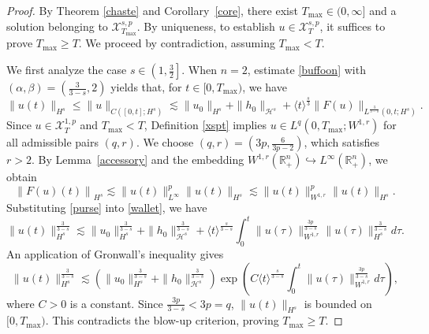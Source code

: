 \documentclass[preprint,compress,12pt]{elsarticle}
\numberwithin{equation}{section}
\begin{document}
\begin{proof}
	By Theorem \ref{chaste} and Corollary~\ref{core}, there exist $T_{\max}\in(0,\infty]$ and a solution belonging to $\mathscr{X}^{s,p}_{T_{\max}}$. By uniqueness, to establish $u \in \mathscr{X}^{s,p}_{T}$, it suffices to prove $T_{\max} \geq T$. We proceed by contradiction, assuming $T_{\max} < T$.
	
	
	We first analyze the case $s \in \left(1,\frac{3}{2}\right]$. When $n=2$, estimate \eqref{buffoon} with $\left(\alpha,\beta\right)=\left(\frac{3}{3-s},2\right)$ yields that, for $t\in [0,T_{\max})$, we have
	\begin{equation}\label{wallet}
		\|u(t)\|_{H^{s}}\leq \|u\|_{C([0,t];H^{s})} \lesssim \|u_{0}\|_{H^{s}}+\|h_{0}\|_{\mathcal{H}^{s}} + \langle t\rangle^{\frac{s}{3}} \|F(u)\|_{L^{\frac{3}{3-s}}(0,t;H^{s})}.
	\end{equation}
	Since $u\in \mathscr{X}^{1,p}_{T}$ and $T_{\max} < T$, Definition \ref{xspt} implies $u\in L^{q}\left(0,T_{\max};W^{1,r}\right)$ for all admissible pairs $(q,r)$. We choose $(q,r)=\left(3p,\frac{6}{3p-2}\right)$, which satisfies $r>2$. By Lemma~\ref{accessory} and the embedding  $W^{1,r}(\mathbb{R}_{+}^{n})\hookrightarrow L^{\infty}(\mathbb{R}_{+}^{n})$, we obtain
	\begin{equation}\label{purse}
		\left\|F(u)(t)\right\|_{H^{s}}\lesssim \|u(t)\|_{L^{\infty}}^{p}\|u(t)\|_{H^{s}}\lesssim \|u(t)\|_{W^{1,r}}^{p}\|u(t)\|_{H^{s}}.
	\end{equation}
	Substituting \eqref{purse} into \eqref{wallet}, we have
	\begin{equation}
		\|u(t)\|_{H^{s}}^{\frac{3}{3-s}}\lesssim \|u_{0}\|_{H^{s}}^{\frac{3}{3-s}}+\|h_{0}\|_{\mathcal{H}^{s}}^{\frac{3}{3-s}}+ \langle t\rangle^{\frac{s}{3-s}} \int_{0}^{t} \|u(\tau)\|_{W^{1,r}}^{\frac{3p}{3-s}}\|u(\tau)\|_{H^{s}}^{\frac{3}{3-s}}d\tau.
	\end{equation}
	An application of Gronwall's inequality gives
	\begin{equation}
		\|u(t)\|_{H^{s}}^{\frac{3}{3-s}}\lesssim \left(\|u_{0}\|_{H^{s}}^{\frac{3}{3-s}}+\|h_{0}\|_{\mathcal{H}^{s}}^{\frac{3}{3-s}}\right) \exp\left(C \langle t\rangle^{\frac{s}{3-s}}\int_{0}^{t}\|u(\tau)\|_{W^{1,r}}^{\frac{3p}{3-s}} d\tau\right),
	\end{equation}
	where $C>0$ is a constant. Since $\frac{3p}{3-s}< 3p=q$,  $\|u(t)\|_{H^{s}}$ is bounded on $[0,T_{\max})$.  This contradicts the blow-up criterion, proving $T_{\max} \geq T$.
	

\end{proof}
\end{document}
